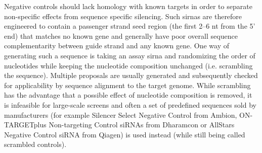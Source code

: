 Negative controls should lack homology with known targets in order to separate non-specific effects from sequence specific silencing. Such \glspl{sirna} are therefore engineered to contain a passenger strand seed region (the first 2--6 nt from the 5' end) that matches no known gene and generally have poor overall sequence complementarity between guide strand and any known gene. One way of generating such a sequence is taking an assay \gls{sirna} and randomizing the order of nucleotides while keeping the nucleotide composition unchanged (i.e. scrambling the sequence). Multiple proposals are usually generated and subsequently checked for applicability by sequence alignment to the target genome. While scrambling has the advantage that a possible effect of nucleotide composition is removed, it is infeasible for large-scale screens and often a set of predefined sequences sold by manufacturers (for example Silencer Select Negative Control from Ambion, ON-TARGETplus Non-targeting Control siRNAs from Dharamcon or AllStars Negative Control siRNA from Qiagen) is used instead (while still being called scrambled controls). 

